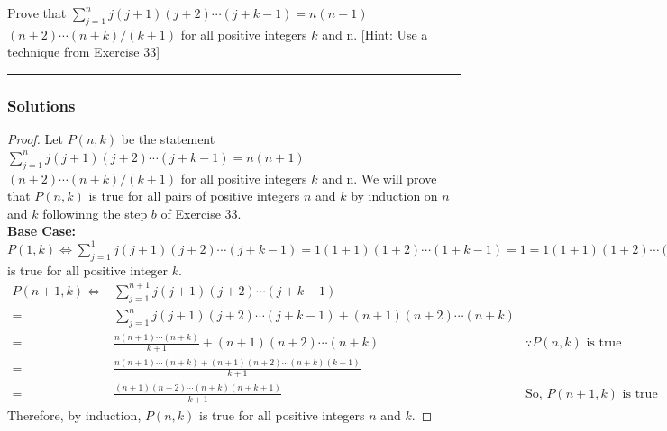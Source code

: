 \newpage
\begin{question}
Prove that $\sum_{j=1}^n j(j+1)(j+2) \cdots(j+k-1)=n(n+1)$ $(n+2) \cdots(n+k) /(k+1)$ for all positive integers $k$ and n. [Hint: Use a technique from Exercise 33]


\begin{figure}[h!]
    \centering
\end{figure}

\end{question}

\par\noindent\rule{\textwidth}{0.5pt}

\subsubsection*{Solutions}

\begin{proof}
    Let $P(n, k)$ be the statement $\sum_{j=1}^n j(j+1)(j+2) \cdots(j+k-1)=n(n+1)$ $(n+2) \cdots(n+k) /(k+1)$ for all positive integers $k$ and n. We will prove that $P(n, k)$ is true for all pairs of positive integers $n$ and $k$ by induction on $n$ and $k$ followinng the step $b$ of Exercise 33.\\
    \textbf{Base Case:} \\
    $P(1, k) \Longleftrightarrow \sum_{j=1}^1 j(j+1)(j+2) \cdots(j+k-1) = 1(1+1)(1+2) \cdots(1+k-1) = 1 = 1(1+1)(1+2) \cdots(1+k)/(k+1)$ is true for all positive integer $k$.\\
    \begin{align*}
        P(n+1, k) \Longleftrightarrow & \sum_{j=1}^{n+1} j(j+1)(j+2) \cdots(j+k-1) \\
        = &\sum_{j=1}^{n} j(j+1)(j+2) \cdots(j+k-1) + (n+1)(n+2) \cdots(n+k)\\
        = & \frac {n(n+1) \cdots(n+k)} {k+1} + (n+1)(n+2) \cdots(n+k) & \because \text{$P(n, k)$ is true}\\
        = & \frac {n(n+1) \cdots(n+k) + (n+1)(n+2) \cdots(n+k)(k+1)} {k+1}\\
        = & \frac {(n+1)(n+2) \cdots(n+k)(n+k+1)} {k+1} & \text{So, $P(n+1, k)$ is true}
    \end{align*}
    Therefore, by induction, $P(n, k)$ is true for all positive integers $n$ and $k$.
\end{proof}